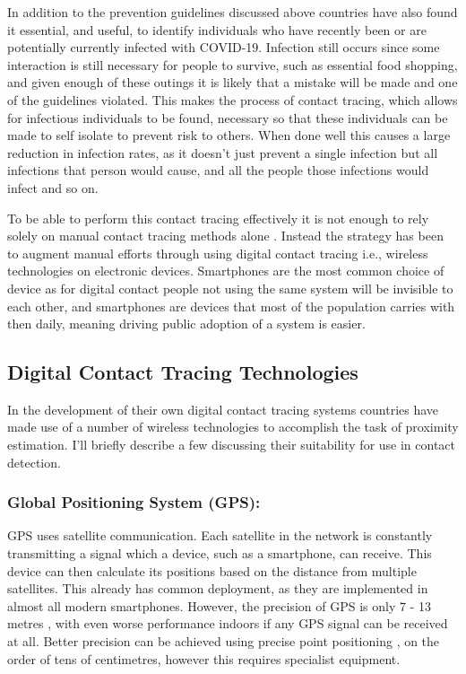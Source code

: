 \documentclass{l4proj}
\begin{document}
In addition to the prevention guidelines discussed above countries have also found it essential, and useful, to identify individuals who have recently been or are potentially currently infected with COVID-19. Infection still occurs since some interaction is still necessary for people to survive, such as essential food shopping, and given enough of these outings it is likely that a mistake will be made and one of the guidelines violated. This makes the process of contact tracing, which allows for infectious individuals to be found, necessary so that these individuals can be made to self isolate to prevent risk to others. When done well this causes a large reduction in infection rates, as it doesn't just prevent a single infection but all infections that person would cause, and all the people those infections would infect and so on.

To be able to perform this contact tracing effectively it is not enough to rely solely on manual contact tracing methods alone \citep{shubina_technical_2020}. Instead the strategy has been to augment manual efforts through using digital contact tracing i.e., wireless technologies on electronic devices. Smartphones are the most common choice of device as for digital contact people not using the same system will be invisible to each other, and smartphones are devices that most of the population carries with then daily, meaning driving public adoption of a system is easier.

\subsection{Digital Contact Tracing Technologies}

In the development of their own digital contact tracing systems countries have made use of a number of wireless technologies to accomplish the task of proximity estimation. I'll briefly describe a few discussing their suitability for use in contact detection.

\subsubsection{Global Positioning System (GPS):}

GPS uses satellite communication. Each satellite in the network is constantly transmitting a signal which a device, such as a smartphone, can receive. This device can then calculate its positions based on the distance from multiple satellites. This already has common deployment, as they are implemented in almost all modern smartphones. However, the precision of GPS is only 7 - 13 metres \citep{merry_smartphone_2019}, with even worse performance indoors if any GPS signal can be received at all. Better precision can be achieved using precise point positioning \citep{elmezayen_precise_2019}, on the order of tens of centimetres, however this requires specialist equipment.
\end{document}
